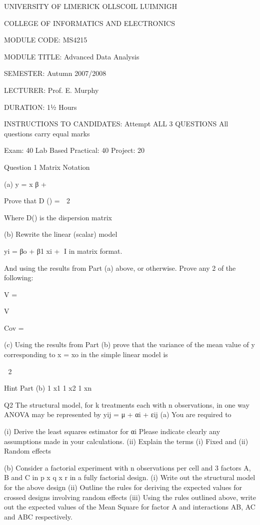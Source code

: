 UNIVERSITY OF LIMERICK
OLLSCOIL LUIMNIGH






COLLEGE OF INFORMATICS AND ELECTRONICS


MODULE CODE:				MS4215

MODULE TITLE:				Advanced Data Analysis

SEMESTER:					Autumn 2007/2008

LECTURER:					Prof. E. Murphy

DURATION:					1½  Hours

INSTRUCTIONS TO CANDIDATES:	Attempt ALL 3 QUESTIONS 
						All questions carry equal marks

						Exam: 40%
						Lab Based Practical: 40%
						Project: 20%





Question 1
Matrix Notation

(a)	y =  x  β  +  

Prove that D () =  2

Where D() is the dispersion matrix


(b) Rewrite the linear (scalar) model 

yi = βo + β1  xi + I   in matrix format.

And using the results from Part (a) above, or otherwise.  Prove any 2 of the following:

V   = 

V  

Cov   =  


(c) Using the results from Part (b) prove that the variance of the mean value of 
      y corresponding to x = xo in the simple linear model is 

 2  {  }
        



Hint Part (b) 			1	 x1
				1	 x2
				1 	 xn
		




Q2
The structural model, for k treatments each with n observations, in one way ANOVA may be represented by  yij = μ + αi + εij
(a) You are required to

(i) Derive the least squares estimator for αi   Please indicate clearly any assumptions made in your calculations.
(ii) Explain the terms  (i) Fixed and (ii) Random effects



(b) Consider a factorial experiment with n observations per cell and 3 factors A, B
and C in p x q x r in a fully factorial design.
(i) Write out the structural model for the above design
(ii) Outline the rules for deriving the expected values for crossed designs involving random effects
(iii)      Using the rules outlined above, write out the expected values of the Mean    Square for factor  A and interactions AB, AC and ABC respectively.

